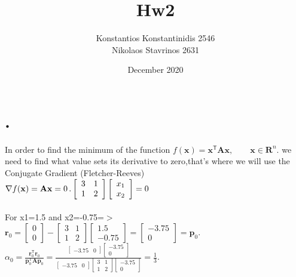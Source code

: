 \documentclass{article}
\title{Hw2}
\author{Konstantios Konstantinidis 2546\\
        Nikolaos Stavrinos 2631}
\date{December 2020}
\begin{document}
\maketitle
\section{.}
In order to find the minimum of the function ${\displaystyle f(\mathbf {x} )=\mathbf {x} ^{\mathsf {T}}\mathbf {A} \mathbf {x} ,\qquad \mathbf {x} \in \mathbf {R} ^{n}.}$
we need to find what value sets its derivative to zero,that's where we will use the Conjugate Gradient (Fletcher-Reeves)\\
${\displaystyle \nabla f(\mathbf {x} )=\mathbf {A} \mathbf {x} =0\,.}\\
\left[\begin{array}{cc} {3} & {1} \\ {1} & {2} \end{array}\right]\left[\begin{array}{l} {x_1} \\ {x_2} \end{array}\right]=0$\\~\\
For x1=1.5 and x2=-0.75=$>$\\
${\displaystyle \mathbf {r} _{0}={\begin{bmatrix}0\\0\end{bmatrix}}-{\begin{bmatrix}3&1\\1&2\end{bmatrix}}{\begin{bmatrix}1.5\\-0.75\end{bmatrix}}={\begin{bmatrix}-3.75\\0\end{bmatrix}}=\mathbf {p} _{0}.}$\\
${\displaystyle \alpha _{0}={\frac {\mathbf {r} _{0}^{\mathsf {T}}\mathbf {r} _{0}}{\mathbf {p} _{0}^{\mathsf {T}}\mathbf {Ap} _{0}}}={\frac {{\begin{bmatrix}-3.75&0\end{bmatrix}}{\begin{bmatrix}-3.75\\0\end{bmatrix}}}{{\begin{bmatrix}-3.75&0\end{bmatrix}}{\begin{bmatrix}3&1\\1&2\end{bmatrix}}{\begin{bmatrix}-3.75\\0\end{bmatrix}}}}={\frac {1
}{3}}.}$\\
\end{document}
